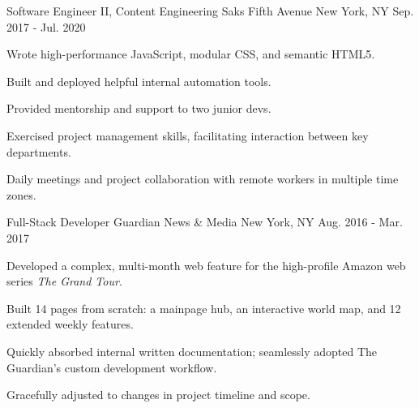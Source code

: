 

\begin{cventries}

  \cventry
    {Software Engineer II, Content Engineering} %
    {Saks Fifth Avenue} %
    {New York, NY} %
    {Sep. 2017 - Jul. 2020} %
    {
      \begin{cvitems} %
       \item {Wrote high-performance JavaScript, modular CSS, and semantic HTML5.}
       \item {Built and deployed helpful internal automation tools.}
	   \item {Provided mentorship and support to two junior devs.}
	   \item {Exercised project management skills, facilitating interaction between key departments.}
	   \item {Daily meetings and project collaboration with remote workers in multiple time zones.} 
      \end{cvitems}
    }

  \cventry
    {Full-Stack Developer} %
    {Guardian News \& Media} %
    {New York, NY} %
    {Aug. 2016 - Mar. 2017} %
    {
      \begin{cvitems} %
        \item {Developed a complex, multi-month web feature for the high-profile Amazon web series \textit{The Grand Tour}.}
        \item {Built 14 pages from scratch: a mainpage hub, an interactive world map, and 12 extended weekly features.}
        \item {Quickly absorbed internal written documentation; seamlessly adopted The Guardian’s custom development workflow.}
        \item {Gracefully adjusted to changes in project timeline and scope.}
      \end{cvitems}
    }


\end{cventries}
